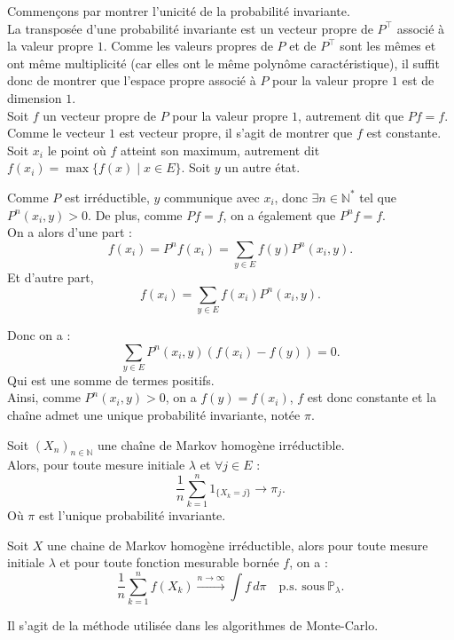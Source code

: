 \documentclass{article}
\begin{document}
\begin{tcolorbox}[colback=white, colframe=green!80!black, title=Démonstration, breakable]
Commençons par montrer l'unicité de la probabilité invariante. \\

La transposée d'une probabilité invariante est un vecteur propre de $P^{\top}$ associé à la valeur propre $1$.
Comme les valeurs propres de $P$ et de $P^{\top}$ sont les mêmes et ont même multiplicité (car elles ont le même polynôme caractéristique), il suffit donc de montrer que l'espace propre associé à $P$ pour la valeur propre $1$ est de dimension $1$. \\

Soit $f$ un vecteur propre de $P$ pour la valeur propre $1$, autrement dit que $Pf = f$. Comme le vecteur $1$ est vecteur propre, il s'agit de montrer que $f$ est constante. \\

Soit $x_i$ le point où $f$ atteint son maximum, autrement dit $f(x_i) = \max\{f(x) \mid x \in E\}$. Soit $y$ un autre état.

Comme $P$ est irréductible, $y$ communique avec $x_i$, donc $\exists n \in \mathbb{N}^{*}$ tel que $P^n(x_i, y) > 0$. De plus, comme $Pf = f$, on a également que $P^n f = f$. \\

On a alors d'une part :
\[
f(x_i) = P^n f(x_i) = \sum_{y \in E} f(y) P^n(x_i, y).
\]
Et d'autre part,
\[
f(x_i) = \sum_{y \in E} f(x_i) P^n(x_i, y).
\]

Donc on a :
\[
\sum_{y \in E} P^n(x_i, y) \left(f(x_i) - f(y)\right) = 0.
\]
Qui est une somme de termes positifs. \\

Ainsi, comme $P^n(x_i, y) > 0$, on a $f(y) = f(x_i)$, $f$ est donc constante et la chaîne admet une unique probabilité invariante, notée $\pi$.
\end{tcolorbox}

\begin{tcolorbox}[colback=white,colframe=red!80!black,title=Valeur de convergence]
Soit $(X_n)_{n \in \mathbb{N}}$ une chaîne de Markov homogène irréductible. \\

Alors, pour toute mesure initiale $\lambda$ et $\forall j \in E$ :
\[
\frac{1}{n} \sum_{k=1}^{n} 1_{\{X_k = j\}} \rightarrow \pi_j.
\]
Où $\pi$ est l'unique probabilité invariante.
\end{tcolorbox}

\begin{tcolorbox}[colback=white,colframe=blue!80!black,title=Convergence des méthodes de Monte-Carlo]
Soit $X$ une chaine de Markov homogène irréductible, alors pour toute mesure initiale $\lambda$ et pour toute fonction mesurable bornée $f$, on a :
\[
\frac{1}{n} \sum_{k=1}^{n} f(X_k) \xrightarrow{n \to \infty} \int f \, d\pi \quad \text{p.s. sous} \ \mathbb{P}_\lambda.
\]

Il s'agit de la méthode utilisée dans les algorithmes de Monte-Carlo.
\end{tcolorbox}
  
\end{document}
